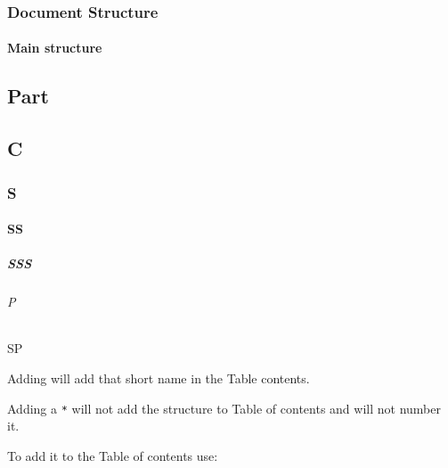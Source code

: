 \section{Document Structure}\label{docStructure}
\subsection{Main structure}
\begin{latex}
\part{Part}
\chapter{C} %
\section{S}
\subsection{SS}
\subsubsection{SSS}
\paragraph{P}
\subparagraph{SP}
\end{latex}

Adding  will add that short name in the Table contents.

Adding a \texttt{*} will not add the structure to Table of contents and will not
number it.

To add it to the Table of contents use:


